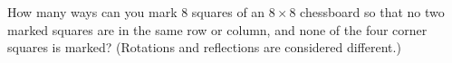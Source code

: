 How many ways can you mark 8 squares of an $8\times8$ chessboard so that no two marked squares are in the same row or column, and none of the four corner squares is marked? (Rotations and reflections are considered different.)